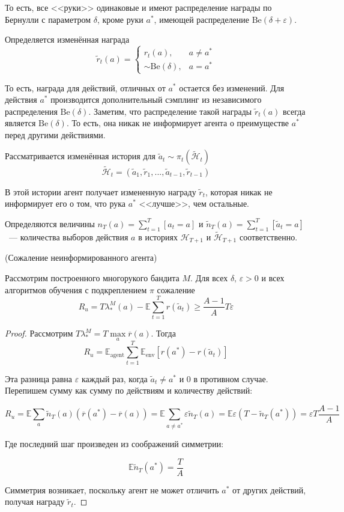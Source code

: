 \documentclass[a4paper]{article}
\newcommand{\Hh}{\mathcal{H}}
\newcommand{\E}{\mathbb{E}}
\newcommand{\Be}{\mbox{Be}}
\def\eps{\varepsilon}
\begin{document}
То есть, все <<руки>> одинаковые и имеют распределение награды по Бернулли с параметром $\delta$, кроме руки $a^*$, имеющей распределение $\Be(\delta+\eps)$.

Определяется изменённая награда
$$\tilde{r}_t(a)=\begin{cases}
r_t(a),&a\neq a^*\\
\sim \Be(\delta),&a=a^*
\end{cases}$$

То есть, награда для действий, отличных от $a^*$ остается без изменений. Для действия $a^*$ производится дополнительный сэмплинг из независимого распределения $\Be(\delta)$. Заметим, что распределение такой награды $\tilde{r}_t(a)$ всегда является $\Be(\delta)$. То есть, она никак не информирует агента о преимуществе $a^*$ перед другими действиями.

Рассматривается изменённая история для $\tilde{a}_t\sim\pi_t(\tilde{\Hh}_t)$
$$\tilde{\Hh}_t=(\tilde{a}_1,\tilde{r}_1,...,\tilde{a}_{t-1},\tilde{r}_{t-1})$$

В этой истории агент получает измененную награду $\tilde{r}_t$, которая никак не информирует его о том, что рука $a^*$ <<лучше>>, чем остальные.

Определяются величины $n_T(a)=\sum\limits_{t=1}^T[a_t=a]$ и $\tilde{n}_T(a)=\sum\limits_{t=1}^T[\tilde{a}_t=a]$~--- количества выборов действия $a$ в историях $\Hh_{T+1}$ и $\tilde{\Hh}_{T+1}$ соответственно.
\begin{lemma}{(Сожаление неинформированного агента)}

Рассмотрим построенного многорукого бандита $M$. Для всех $\delta,\,\eps>0$ и всех алгоритмов обучения с подкреплением $\pi$ сожаление
$$R_u=T\lambda_*^M(a)-\E\sum\limits_{t=1}^Tr(\tilde{a}_t)\geqslant\frac{A-1}{A}T\eps$$
\end{lemma}

\begin{proof}
	
Рассмотрим $T\lambda_*^M=T\max\limits_a\overline{r}(a)$. Тогда $$R_u=\E_{\mbox{agent}}\sum\limits_{t=1}^T \E_{\mbox{env}}[r(a^*)-r(\tilde{a}_t)]$$

Эта разница равна $\eps$ каждый раз, когда $\tilde{a}_t\neq a^*$ и $0$ в противном случае. Перепишем сумму как сумму по действиям и количеству действий:

$$R_u=\E\sum\limits_{a} \tilde{n}_T(a)(\overline{r}(a^*)-\overline{r}(a))=\E\sum\limits_{a\neq a^*}\eps \tilde{n}_T(a)=\E \eps(T-\tilde{n}_T(a^*))=\eps T\frac{A-1}{A}$$

Где последний шаг произведен из соображений симметрии:

$$\E \tilde{n}_T(a^*)=\frac{T}{A}$$

Симметрия возникает, поскольку агент не может отличить $a^*$ от других действий, получая награду $\tilde{r}_t$.
\end{proof}
\end{document}
